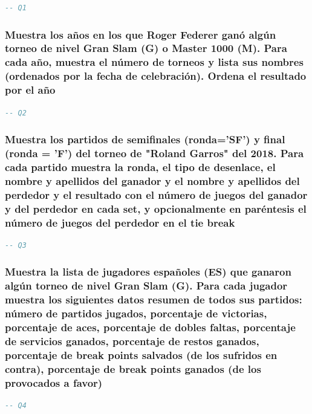 \documentclass[10pt]{opticajnl}
\begin{document}
\begin{lstlisting}[language=SQL]
-- Q1
\end{lstlisting}





\subsubsection{Muestra los años en los que Roger Federer ganó algún torneo de nivel Gran Slam (G) o Master 1000 (M). Para cada año, muestra el número de torneos y lista sus nombres (ordenados por la fecha de celebración). Ordena el resultado por el año}

\begin{lstlisting}[language=SQL]
-- Q2
\end{lstlisting}





\subsubsection{Muestra los partidos de semiﬁnales (ronda='SF') y ﬁnal (ronda = 'F') del torneo de "Roland Garros" del 2018. Para cada partido muestra la ronda, el tipo de desenlace, el nombre y apellidos del ganador y el nombre y apellidos del perdedor y el resultado con el número de juegos del ganador y del perdedor en cada set, y opcionalmente en paréntesis el número de juegos del perdedor en el tie break}

\begin{lstlisting}[language=SQL]
-- Q3
\end{lstlisting}





\subsubsection{Muestra la lista de jugadores españoles (ES) que ganaron algún torneo de nivel Gran Slam (G). Para cada jugador muestra los siguientes datos resumen de todos sus partidos: número de partidos jugados, porcentaje de victorias, porcentaje de aces, porcentaje de dobles faltas, porcentaje de servicios ganados, porcentaje de restos ganados, porcentaje de break points salvados (de los sufridos en contra), porcentaje de break points ganados (de los provocados a favor)}

\begin{lstlisting}[language=SQL]
-- Q4
\end{lstlisting}
\end{document}

